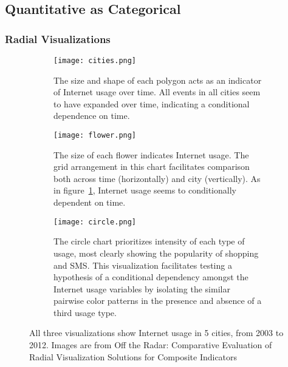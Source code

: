 \documentclass[../main.tex]{subfiles}
\begin{document}
\subsection{Quantitative as Categorical}

\subsubsection{Radial Visualizations}
\begin{figure}
    \begin{subfigure}{\textwidth}
    \centering
    \texttt{[image: cities.png]}
    \caption{The size and shape of each polygon acts as an indicator of Internet usage over time. All events in all cities seem to have expanded over time, indicating a conditional dependence on time.}
    \label{fig:radarchart}
    \end{subfigure}

    \bigskip
    \begin{subfigure}{\textwidth}
    \centering
    \texttt{[image: flower.png]}
    \caption{The size of each flower indicates Internet usage. The grid arrangement in this chart facilitates comparison both across time (horizontally) and city (vertically). As in figure~\ref{fig:radarchart}, Internet usage seems to conditionally dependent on time.}
    \label{fig:flowerchart}
    \end{subfigure}

    \bigskip
    \begin{subfigure}{\textwidth}
    \centering
    \texttt{[image: circle.png]}
    \caption{The circle chart prioritizes intensity of each type of usage, most clearly showing the popularity of shopping and SMS. This visualization facilitates testing a hypothesis of a conditional dependency amongst the Internet usage variables by isolating the similar pairwise color patterns in the presence and absence of a third usage type.}
    \label{fig:circlechart}
    \end{subfigure}
\caption{All three visualizations show Internet usage in 5 cities, from 2003 to 2012. Images are from Off the Radar: Comparative Evaluation of Radial Visualization Solutions for Composite Indicators \cite{albo_off_2016}}
\label{fig:radial}
\end{figure}
\end{document}
